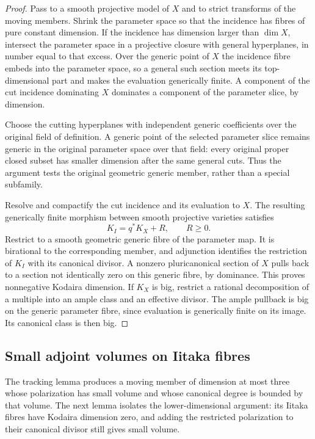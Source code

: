 \begin{proof}
Pass to a smooth projective model of $X$ and to strict transforms of
the moving members.  Shrink the parameter space so that the incidence
has fibres of pure constant dimension.  If the incidence has dimension
larger than $\dim X$, intersect the parameter space in a projective
closure with general hyperplanes, in number equal to that excess.
Over the generic point of $X$ the incidence fibre embeds into the
parameter space, so a general such section meets its top-dimensional
part and makes the evaluation generically finite.  A component of
the cut incidence dominating $X$ dominates a component of the parameter
slice, by dimension.

Choose the cutting hyperplanes with independent generic coefficients
over the original field of definition.  A generic point of the selected
parameter slice remains generic in the original parameter space over
that field: every original proper closed subset has smaller dimension
after the same general cuts.  Thus the argument tests the original
geometric generic member, rather than a special subfamily.

Resolve and compactify the cut incidence and its evaluation to $X$.
The resulting generically finite morphism between smooth projective
varieties satisfies
\[
 K_I=q^*K_X+R,\qquad R\ge0.
\]
Restrict to a smooth geometric generic fibre of the parameter map.
It is birational to the corresponding member, and adjunction identifies
the restriction of $K_I$ with its canonical divisor.  A nonzero
pluricanonical section of $X$ pulls back to a section not identically
zero on this generic fibre, by dominance.  This proves nonnegative
Kodaira dimension.  If $K_X$ is big, restrict a rational decomposition
of a multiple into an ample class and an effective divisor.  The
ample pullback is big on the generic parameter fibre, since evaluation
is generically finite on its image.  Its canonical class is then big.
\end{proof}

\subsection{Small adjoint volumes on Iitaka fibres}

The tracking lemma produces a moving member of dimension at most three
whose polarization has small volume and whose canonical degree is bounded
by that volume.  The next lemma isolates the lower-dimensional argument:
its Iitaka fibres have Kodaira dimension zero, and adding the restricted
polarization to their canonical divisor still gives small volume.

